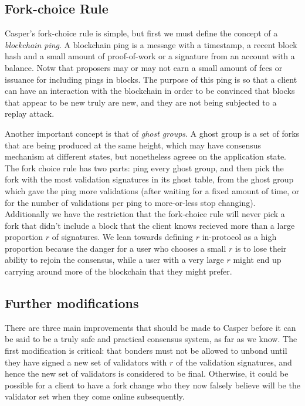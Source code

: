 \documentclass[11pt,a4paper]{article}
\begin{document}
\subsection{Fork-choice Rule}

Casper's fork-choice rule is simple, but first we must define the concept of a \emph{blockchain ping}. A blockchain ping is a message with a timestamp, a recent block hash and a small amount of proof-of-work or a signature from an account with a balance. Notw that proposers may or may not earn a small amount of fees or issuance for including pings in blocks. The purpose of this ping is so that a client can have an interaction with the blockchain in order to be convinced that blocks that appear to be new truly are new, and they are not being subjected to a replay attack.

Another important concept is that of \emph{ghost groups}. A ghost group is a set of forks that are being produced at the same height, which may have consensus mechanism at different states, but nonetheless agreee on the application state. The fork choice rule has two parts: ping every ghost group, and then pick the fork with the most validation signatures in its ghost table, from the ghost group which gave the ping more validations (after waiting for a fixed amount of time, or for the number of validations per ping to more-or-less stop changing). Additionally we have the restriction that the fork-choice rule will never pick a fork that didn't include a block that the client knows recieved more than a large proportion $r$ of signatures. We lean towards defining $r$ in-protocol as a high proportion because the danger for a user who chooses a small $r$ is to lose their ability to rejoin the consensus, while a user with a very large $r$ might end up carrying around more of the blockchain that they might prefer. 

\subsection{Further modifications}

There are three main improvements that should be made to Casper before it can be said to be a truly safe and practical consensus system, as far as we know. The first modification is critical: that bonders must not be allowed to unbond until they have signed a new set of validators with $r$ of the validation signatures, and hence the new set of validators is considered to be final. Otherwise, it could be possible for a client to have a fork change who they now falsely believe will be the validator set when they come online subsequently.
\end{document}
